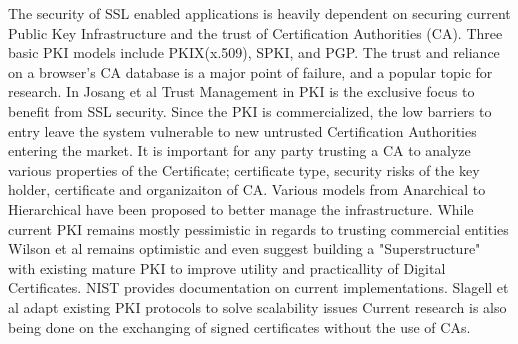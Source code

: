 \documentclass[10pt,twocolumn,pdftex]{article}
\begin{document}
The security of SSL enabled applications is heavily dependent on securing current Public Key Infrastructure and the trust of Certification Authorities (CA). Three basic PKI models include PKIX(x.509), SPKI, and PGP.\cite{josang2000pki}\cite{kent1998evaluating} The trust and reliance on a browser's CA database is a major point of failure, and a popular topic for research. \cite{kent1998evaluating}In Josang et al Trust Management in PKI is the exclusive focus to benefit from SSL security.\cite{josang2000pki}  Since the PKI is commercialized, the low barriers to entry leave the system vulnerable to new untrusted Certification Authorities entering the market.\cite{ellison2000ten} It is important for any party trusting a CA to analyze various properties of the Certificate; certificate type, security risks of the key holder, certificate and organizaiton of CA. \cite{zhang2010improved} Various models from Anarchical to Hierarchical have been proposed to better manage the infrastructure.\cite{kaufman2002network} While current PKI remains mostly pessimistic in regards to trusting commercial entities Wilson et al remains optimistic and even suggest building a "Superstructure" with existing mature PKI to improve utility and practicallity of Digital Certificates.\cite{wilson2008public} NIST provides documentation on current implementations.\cite{kuhn2001introduction} Slagell et al adapt existing PKI protocols to solve scalability issues  \cite{slagell2004pki}  Current research is also being done on the exchanging of signed certificates without the use of CAs. \cite{sharifiVeriKey}
\end{document}
